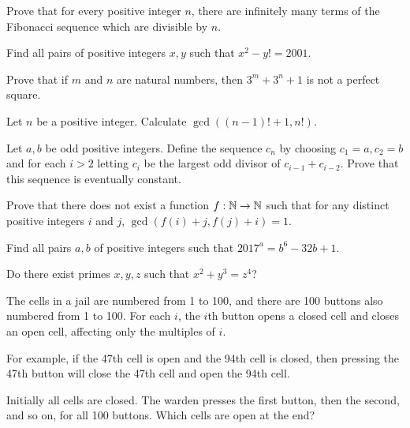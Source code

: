 \begin{problem}{\label{p:i:n:pr:62}}
  Prove that for every positive integer $n$, there are infinitely many
    terms of the Fibonacci sequence which are divisible by $n$.
\end{problem}
\begin{problem}{\label{p:i:n:pr:63}}
  Find all pairs of positive integers $x,y$ such that $x^2-y!=2001$.
\end{problem}
\begin{problem}{\label{p:i:n:pr:64}}
  Prove that if $m$ and $n$ are natural numbers, then $3^m+3^n+1$ is not a
    perfect square.
\end{problem}
\begin{problem}{\label{p:i:n:pr:65}}
      Let $n$ be a positive integer. Calculate $\gcd((n-1)!+1,n!)$.
\end{problem}
\begin{problem}{\label{p:i:n:pr:66}}
  Let $a,b$ be odd positive integers. Define the sequence $c_n$ by
    choosing $c_1=a,c_2=b$ and for each $i>2$ letting $c_i$ be the largest odd
    divisor of $c_{i-1}+c_{i-2}$. Prove that this sequence is eventually
    constant.
\end{problem}
\begin{problem}{\label{p:i:n:pr:67}}
  Prove that there does not exist a function $f:\mathbb{N}\to\mathbb{N}$
    such that for any distinct positive integers $i$ and $j$,
    $\gcd(f(i)+j,f(j)+i)=1$.
\end{problem}
\begin{problem}{\label{p:i:n:pr:68}}
  Find all pairs $a,b$ of positive integers such that $2017^a=b^6-32b+1$.
\end{problem}
\begin{problem}{\label{p:i:n:pr:69}}
  Do there exist primes $x,y,z$ such that $x^2+y^3=z^4$?
\end{problem}
\begin{problem}{\label{p:i:n:pr:70}}
      The cells in a jail are numbered from 1 to 100, and there are 100
    buttons also numbered from 1 to 100. For each $i$, the $i$th button opens a
    closed cell and closes an open cell, affecting only the multiples of $i$. 

    For example, if the 47th cell is open and the 94th cell is closed, then
    pressing the 47th button will close the 47th cell and open the 94th cell.

    Initially all cells are closed.
    The warden presses the first button, then the second, and so on, for all
    100 buttons. Which cells are open at the end?
\end{problem}
